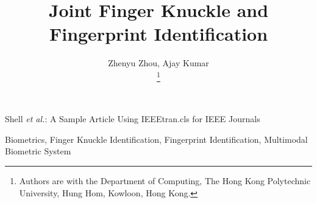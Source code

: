 \documentclass[lettersize, journal]{IEEEtran}
\begin{document}
\title{Joint Finger Knuckle and Fingerprint Identification}

\author{{Zhenyu Zhou, Ajay Kumar}

\thanks{Authors are with the Department of Computing, The Hong Kong Polytechnic University, Hung Hom, Kowloon, Hong Kong.}}

%
{Shell \MakeLowercase{\textit{et al.}}: A Sample Article Using IEEEtran.cls for IEEE Journals}

\maketitle

\begin{abstract}

\end{abstract}

\begin{IEEEkeywords}
  Biometrics, Finger Knuckle Identification, Fingerprint Identification, Multimodal Biometric System
\end{IEEEkeywords}













\end{document}
